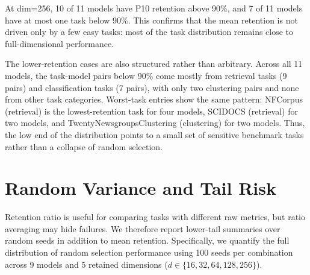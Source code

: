 \documentclass[11pt,a4paper]{article}
\begin{document}
At dim=256, 10 of 11 models have P10 retention above 90\%, and 7 of 11 models have at most one task below 90\%. This confirms that the mean retention is not driven only by a few easy tasks: most of the task distribution remains close to full-dimensional performance.

The lower-retention cases are also structured rather than arbitrary. Across all 11 models, the task-model pairs below 90\% come mostly from retrieval tasks (9 pairs) and classification tasks (7 pairs), with only two clustering pairs and none from other task categories. Worst-task entries show the same pattern: NFCorpus (retrieval) is the lowest-retention task for four models, SCIDOCS (retrieval) for two models, and TwentyNewsgroupsClustering (clustering) for two models. Thus, the low end of the distribution points to a small set of sensitive benchmark tasks rather than a collapse of random selection.

\section{Random Variance and Tail Risk}
\label{sec:random_variance}

Retention ratio is useful for comparing tasks with different raw metrics, but ratio averaging may hide failures. We therefore report lower-tail summaries over random seeds in addition to mean retention. Specifically, we quantify the full distribution of random selection performance using 100 seeds per combination across 9 models and 5 retained dimensions ($d \in \{16, 32, 64, 128, 256\}$).
\end{document}
